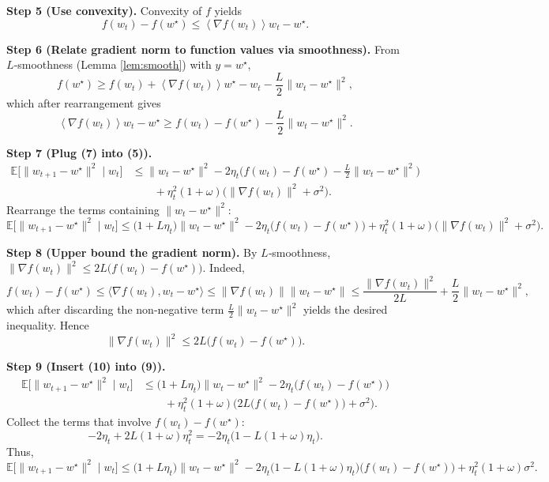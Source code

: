\documentclass{article}
\newcommand{\EE}{\mathbb{E}}
\newcommand{\inner}[1]{\left\langle#1\right\rangle}
\begin{document}
\noindent\textbf{Step 5 (Use convexity).}  
Convexity of $f$ yields
\[
f(w_t)-f(w^\star)\le\inner{\nabla f(w_t)}{w_t-w^\star}. \tag{6}
\]

\noindent\textbf{Step 6 (Relate gradient norm to function values via smoothness).}  
From $L$‑smoothness (Lemma \ref{lem:smooth}) with $y=w^\star$,
\[
f(w^\star)\ge f(w_t)+\inner{\nabla f(w_t)}{w^\star-w_t}
-\frac{L}{2}\|w_t-w^\star\|^2,
\]
which after rearrangement gives
\[
\inner{\nabla f(w_t)}{w_t-w^\star}\ge f(w_t)-f(w^\star)-\frac{L}{2}\|w_t-w^\star\|^2 .\tag{7}
\]

\noindent\textbf{Step 7 (Plug (7) into (5)).}
\begin{align}
\EE\!\big[\|w_{t+1}-w^\star\|^2\mid w_t\big] 
&\le \|w_t-w^\star\|^2 
-2\eta_t\Big(f(w_t)-f(w^\star)-\frac{L}{2}\|w_t-w^\star\|^2\Big) \nonumber\\
&\qquad +\eta_t^2(1+\omega)\big(\|\nabla f(w_t)\|^2+\sigma^2\big). \tag{8}
\end{align}
Rearrange the terms containing $\|w_t-w^\star\|^2$:
\[
\EE\!\big[\|w_{t+1}-w^\star\|^2\mid w_t\big] 
\le \big(1+L\eta_t\big)\|w_t-w^\star\|^2
-2\eta_t\big(f(w_t)-f(w^\star)\big)
+\eta_t^2(1+\omega)\big(\|\nabla f(w_t)\|^2+\sigma^2\big). \tag{9}
\]

\noindent\textbf{Step 8 (Upper bound the gradient norm).}  
By $L$‑smoothness, $\|\nabla f(w_t)\|^2\le 2L\big(f(w_t)-f(w^\star)\big)$. Indeed,
\[
f(w_t)-f(w^\star)\le\langle\nabla f(w_t),w_t-w^\star\rangle\le \|\nabla f(w_t)\|\|w_t-w^\star\|
\le \frac{\|\nabla f(w_t)\|^2}{2L}+\frac{L}{2}\|w_t-w^\star\|^2,
\]
which after discarding the non‑negative term $\frac{L}{2}\|w_t-w^\star\|^2$ yields the desired inequality. Hence
\[
\|\nabla f(w_t)\|^2\le 2L\big(f(w_t)-f(w^\star)\big).\tag{10}
\]

\noindent\textbf{Step 9 (Insert (10) into (9)).}
\begin{align}
\EE\!\big[\|w_{t+1}-w^\star\|^2\mid w_t\big] 
&\le \big(1+L\eta_t\big)\|w_t-w^\star\|^2
-2\eta_t\big(f(w_t)-f(w^\star)\big) \nonumber\\
&\qquad +\eta_t^2(1+\omega)\big(2L\big(f(w_t)-f(w^\star)\big)+\sigma^2\big). \tag{11}
\end{align}
Collect the terms that involve $f(w_t)-f(w^\star)$:
\[
-2\eta_t + 2L(1+\omega)\eta_t^2 = -2\eta_t\Big(1- L(1+\omega)\eta_t\Big).
\]
Thus,
\[
\EE\!\big[\|w_{t+1}-w^\star\|^2\mid w_t\big] 
\le \big(1+L\eta_t\big)\|w_t-w^\star\|^2
-2\eta_t\Big(1- L(1+\omega)\eta_t\Big)\big(f(w_t)-f(w^\star)\big)
+\eta_t^2(1+\omega)\sigma^2 .\tag{12}
\]
\end{document}
